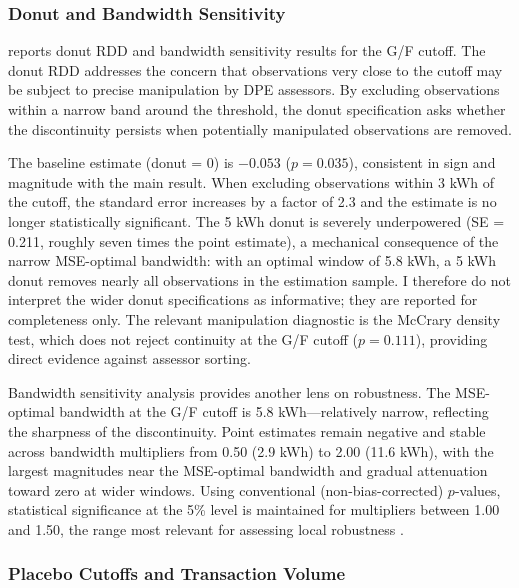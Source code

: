 \documentclass[12pt]{article}
\begin{document}
\subsubsection{Donut and Bandwidth Sensitivity}

 reports donut RDD and bandwidth sensitivity results for the G/F cutoff. The donut RDD addresses the concern that observations very close to the cutoff may be subject to precise manipulation by DPE assessors. By excluding observations within a narrow band around the threshold, the donut specification asks whether the discontinuity persists when potentially manipulated observations are removed.

The baseline estimate (donut = 0) is $-0.053$ ($p = 0.035$), consistent in sign and magnitude with the main result. When excluding observations within 3 kWh of the cutoff, the standard error increases by a factor of 2.3 and the estimate is no longer statistically significant. The 5 kWh donut is severely underpowered (SE = 0.211, roughly seven times the point estimate), a mechanical consequence of the narrow MSE-optimal bandwidth: with an optimal window of 5.8 kWh, a 5 kWh donut removes nearly all observations in the estimation sample. I therefore do not interpret the wider donut specifications as informative; they are reported for completeness only. The relevant manipulation diagnostic is the McCrary density test, which does not reject continuity at the G/F cutoff ($p = 0.111$), providing direct evidence against assessor sorting.

Bandwidth sensitivity analysis provides another lens on robustness. The MSE-optimal bandwidth at the G/F cutoff is 5.8 kWh---relatively narrow, reflecting the sharpness of the discontinuity. Point estimates remain negative and stable across bandwidth multipliers from 0.50 (2.9 kWh) to 2.00 (11.6 kWh), with the largest magnitudes near the MSE-optimal bandwidth and gradual attenuation toward zero at wider windows. Using conventional (non-bias-corrected) $p$-values, statistical significance at the 5\% level is maintained for multipliers between 1.00 and 1.50, the range most relevant for assessing local robustness \citep{calonico2020optimal}.



\subsubsection{Placebo Cutoffs and Transaction Volume}
\end{document}
